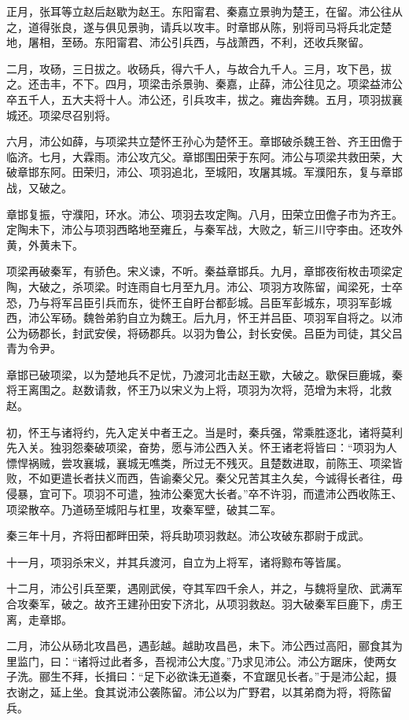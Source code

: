 \documentclass[]{article}
\begin{document}
正月，张耳等立赵后赵歇为赵王。东阳甯君、秦嘉立景驹为楚王，在留。沛公往从之，道得张良，遂与俱见景驹，请兵以攻丰。时章邯从陈，别将司马将兵北定楚地，屠相，至砀。东阳甯君、沛公引兵西，与战萧西，不利，还收兵聚留。

二月，攻砀，三日拔之。收砀兵，得六千人，与故合九千人。三月，攻下邑，拔之。还击丰，不下。四月，项梁击杀景驹、秦嘉，止薛，沛公往见之。项梁益沛公卒五千人，五大夫将十人。沛公还，引兵攻丰，拔之。雍齿奔魏。五月，项羽拔襄城还。项梁尽召别将。

六月，沛公如薛，与项梁共立楚怀王孙心为楚怀王。章邯破杀魏王咎、齐王田儋于临济。七月，大霖雨。沛公攻亢父。章邯围田荣于东阿。沛公与项梁共救田荣，大破章邯东阿。田荣归，沛公、项羽追北，至城阳，攻屠其城。军濮阳东，复与章邯战，又破之。

章邯复振，守濮阳，环水。沛公、项羽去攻定陶。八月，田荣立田儋子市为齐王。定陶未下，沛公与项羽西略地至雍丘，与秦军战，大败之，斩三川守李由。还攻外黄，外黄未下。

项梁再破秦军，有骄色。宋义谏，不听。秦益章邯兵。九月，章邯夜衔枚击项梁定陶，大破之，杀项梁。时连雨自七月至九月。沛公、项羽方攻陈留，闻梁死，士卒恐，乃与将军吕臣引兵而东，徙怀王自盱台都彭城。吕臣军彭城东，项羽军彭城西，沛公军砀。魏咎弟豹自立为魏王。后九月，怀王并吕臣、项羽军自将之。以沛公为砀郡长，封武安侯，将砀郡兵。以羽为鲁公，封长安侯。吕臣为司徒，其父吕青为令尹。

章邯已破项梁，以为楚地兵不足忧，乃渡河北击赵王歇，大破之。歇保巨鹿城，秦将王离围之。赵数请救，怀王乃以宋义为上将，项羽为次将，范增为末将，北救赵。

初，怀王与诸将约，先入定关中者王之。当是时，秦兵强，常乘胜逐北，诸将莫利先入关。独羽怨秦破项梁，奋势，愿与沛公西入关。怀王诸老将皆曰：``项羽为人慓悍祸贼，尝攻襄城，襄城无噍类，所过无不残灭。且楚数进取，前陈王、项梁皆败，不如更遣长者扶义而西，告谕秦父兄。秦父兄苦其主久矣，今诚得长者往，毋侵暴，宜可下。项羽不可遣，独沛公秦宽大长者。''卒不许羽，而遣沛公西收陈王、项梁散卒。乃道砀至城阳与杠里，攻秦军壁，破其二军。

秦三年十月，齐将田都畔田荣，将兵助项羽救赵。沛公攻破东郡尉于成武。

十一月，项羽杀宋义，并其兵渡河，自立为上将军，诸将黥布等皆属。

十二月，沛公引兵至栗，遇刚武侯，夺其军四千余人，并之，与魏将皇欣、武满军合攻秦军，破之。故齐王建孙田安下济北，从项羽救赵。羽大破秦军巨鹿下，虏王离，走章邯。

二月，沛公从砀北攻昌邑，遇彭越。越助攻昌邑，未下。沛公西过高阳，郦食其为里监门，曰：``诸将过此者多，吾视沛公大度。''乃求见沛公。沛公方踞床，使两女子洗。郦生不拜，长揖曰：``足下必欲诛无道秦，不宜踞见长者。''于是沛公起，摄衣谢之，延上坐。食其说沛公袭陈留。沛公以为广野君，以其弟商为将，将陈留兵。
\end{document}
